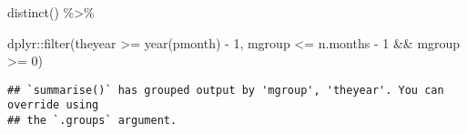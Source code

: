 \documentclass[
]{article}
\newenvironment{Shaded}{\begin{snugshade}}{\end{snugshade}}
\newcommand{\DecValTok}[1]{\textcolor[rgb]{0.00,0.00,0.81}{#1}}
\newcommand{\FunctionTok}[1]{\textcolor[rgb]{0.00,0.00,0.00}{#1}}
\newcommand{\NormalTok}[1]{#1}
\newcommand{\SpecialCharTok}[1]{\textcolor[rgb]{0.00,0.00,0.00}{#1}}
\begin{document}
\begin{Shaded}
\begin{Highlighting}[]
  \FunctionTok{distinct}\NormalTok{() }\SpecialCharTok{\%\textgreater{}\%}
  
\NormalTok{  dplyr}\SpecialCharTok{::}\FunctionTok{filter}\NormalTok{(theyear }\SpecialCharTok{\textgreater{}=} \FunctionTok{year}\NormalTok{(pmonth) }\SpecialCharTok{{-}} \DecValTok{1}\NormalTok{, mgroup }\SpecialCharTok{\textless{}=}\NormalTok{ n.months }\SpecialCharTok{{-}} \DecValTok{1} \SpecialCharTok{\&\&}
\NormalTok{                mgroup }\SpecialCharTok{\textgreater{}=} \DecValTok{0}\NormalTok{)}
\end{Highlighting}
\end{Shaded}

\begin{verbatim}
## `summarise()` has grouped output by 'mgroup', 'theyear'. You can override using
## the `.groups` argument.
\end{verbatim}
\end{document}
